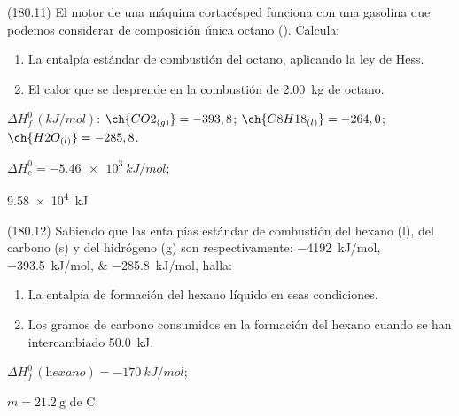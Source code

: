   \begin{exercise}[
      tags    = {},
      topics  = {química, termodinámica, termoquímica},
      source  = {FQ 1B MGH 2016, p180, e11},
    ]
    (180.11) El motor de una máquina cortacésped funciona con una gasolina que podemos considerar de composición única octano (). Calcula:

    \begin{enumerate}
      \item La entalpía estándar de combustión del octano, aplicando la ley de Hess.
      \item El calor que se desprende en la combustión de \SI{2.00}{\kilo\gram} de octano.
    \end{enumerate}

    \begin{gexdatos}
      \( \Delta H^0_f\,(\si{kJ/mol}) \):
      \( \ch{CO2_{(g)}}   = -393,8 \);
      \( \ch{C8H18_{(l)}} = -264,0 \);
      \( \ch{H2O_{(l)}}   = -285,8 \).
    \end{gexdatos}
  \end{exercise}

  \begin{solution}
    \begin{enumerate*}
      \item \( \Delta H^0_c = \SI{-5.46e3}{kJ/mol} \); \item \SI{9.58e4}{kJ}
    \end{enumerate*}
  \end{solution}




  \begin{exercise}[
      tags    = {},
      topics  = {química, termodinámica, termoquímica},
      source  = {FQ 1B MGH 2016, p180, e12},
    ]
    (180.12) Sabiendo que las entalpías estándar de combustión del
    hexano (l), del carbono (s) y del hidrógeno (g) son respectivamente:
    \SIlist{-4192;-393,5;-285,8}{kJ/mol}, halla:

    \begin{enumerate}
      \item La entalpía de formación del hexano líquido en esas condiciones.
      \item Los gramos de carbono consumidos en la formación del hexano cuando se han intercambiado \SI{50.0}{kJ}.
    \end{enumerate}
  \end{exercise}

  \begin{solution}
    \begin{enumerate*}
      \item \( \Delta H^0_f\,(\textit{hexano}) = \SI{-170}{kJ/mol} \);
      \item \( m = \SI{21.2}{\gram} \) de C.
    \end{enumerate*}
  \end{solution}




